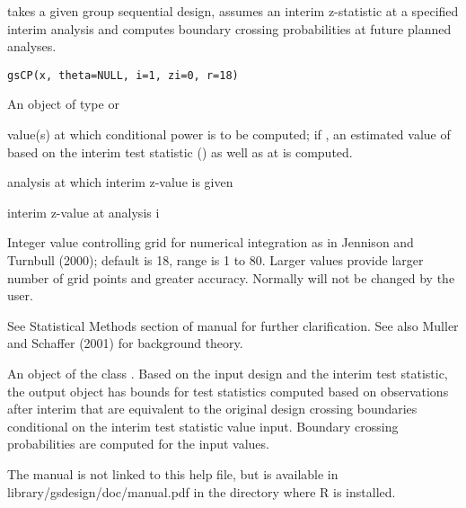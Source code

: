 \begin{Description}\relax
{} takes a given group sequential design, assumes an interim z-statistic 
at a specified interim analysis and computes boundary crossing probabilities at future planned analyses.
\end{Description}
\begin{Usage}
\begin{verbatim}
gsCP(x, theta=NULL, i=1, zi=0, r=18)
\end{verbatim}
\end{Usage}
\begin{Arguments}
\begin{ldescription}
\item[\code{x}] An object of type  or 
\item[\code{theta}]  value(s) at which conditional power is to be computed; if , 
an estimated value of  based on the interim test statistic () as well as at 
is computed.
\item[\code{i}] analysis at which interim z-value is given
\item[\code{zi}] interim z-value at analysis i
\item[\code{r}] Integer value controlling grid for numerical integration as in Jennison and Turnbull (2000); 
default is 18, range is 1 to 80. 
Larger values provide larger number of grid points and greater accuracy.
Normally  will not be changed by the user.
\end{ldescription}
\end{Arguments}
\begin{Details}\relax
See Statistical Methods section of manual for further clarification. See also Muller and Schaffer (2001) for background theory.
\end{Details}
\begin{Value}
An object of the class .
Based on the input design and the interim test statistic, the output object has bounds for test statistics
computed based on observations after interim  that are equivalent to the original design crossing boundaries conditional
on the interim test statistic value input. 
Boundary crossing probabilities are computed for the input 
 values.
\end{Value}
\begin{Note}\relax
The manual is not linked to this help file, but is available in library/gsdesign/doc/manual.pdf
in the directory where R is installed.
\end{Note}
